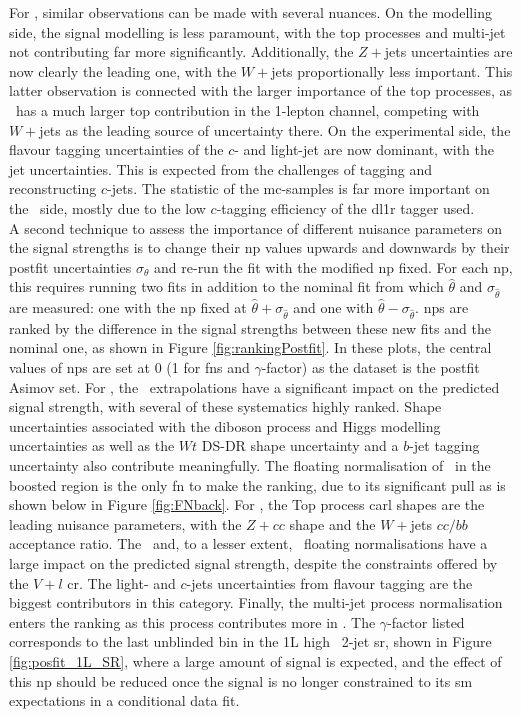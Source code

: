 For \vhc, similar observations can be made with several nuances. On the modelling side, the signal modelling is less paramount, with the top processes and multi-jet not contributing far more significantly. Additionally, the $Z+$jets uncertainties are now clearly the leading one, with the $W+$jets proportionally less important. This latter observation is connected with the larger importance of the top processes, as \vhc\ has a much larger top contribution in the 1-lepton channel, competing with $W+$jets as the leading source of uncertainty there. On the experimental side, the flavour tagging uncertainties of the $c$- and light-jet are now dominant, with the jet uncertainties. This is expected from the challenges of tagging and reconstructing $c$-jets. The statistic of the \gls{mc}-samples is far more important on the \vhc\ side, mostly due to the low $c$-tagging efficiency of the \gls{dl1r} tagger used. \\

A second technique to assess the importance of different nuisance parameters on the signal strengths is to change their \gls{np} values upwards and downwards by their postfit uncertainties $\sigma_{\theta}$ and re-run the fit with the modified \gls{np} fixed. For each \gls{np}, this requires running two fits in addition to the nominal fit from which $\hat{\theta}$ and $\sigma_{\hat{\theta}}$ are measured: one with the \gls{np} fixed at $\hat{\theta} + \sigma_{\hat{\theta}}$ and one with $\hat{\theta} - \sigma_{\hat{\theta}}$. \glspl{np} are ranked by the difference in the signal strengths between these new fits and the nominal one, as shown in Figure \ref{fig:rankingPostfit}. In these plots, the central values of \glspl{np} are set at 0 (1 for \glspl{fn} and $\gamma$-factor) as the dataset is the postfit Asimov set. For \vhb, the \whf\ extrapolations have a significant impact on the predicted signal strength, with several of these systematics highly ranked. Shape uncertainties associated with the diboson process and Higgs modelling uncertainties as well as the $Wt$ DS-DR shape uncertainty and a $b$-jet tagging uncertainty also contribute meaningfully. The floating normalisation of \whf\ in the boosted region is the only \gls{fn} to make the ranking, due to its significant pull as is shown below in Figure \ref{fig:FNback}. For \vhc, the Top process \gls{carl} shapes are the leading nuisance parameters, with the $Z+cc$ shape and the $W+$jets $cc/bb$ acceptance ratio. The \zlf\ and, to a lesser extent, \wlf\ floating normalisations have a large impact on the predicted signal strength, despite the constraints offered by the $V+l$ \gls{cr}. The light- and $c$-jets uncertainties from flavour tagging are the biggest contributors in this category. Finally, the multi-jet process normalisation enters the ranking as this process contributes more in \vhc. The $\gamma$-factor listed corresponds to the last unblinded bin in the 1L high \ptv\ 2-jet \gls{sr}, shown in Figure \ref{fig:posfit_1L_SR}, where a large amount of signal is expected, and the effect of this \gls{np} should be reduced once the signal is no longer constrained to its \gls{sm} expectations in a conditional data fit.

